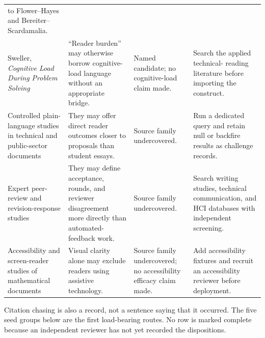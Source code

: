 \begin{longtable}{@{}>{\raggedright\arraybackslash}p{}
>{\raggedright\arraybackslash}p{}
>{\raggedright\arraybackslash}p{}
>{\raggedright\arraybackslash}p{}@{}}
to Flower--Hayes and Bereiter--Scardamalia. \\
Sweller, \emph{Cognitive Load During Problem Solving} & ``Reader burden'' may
otherwise borrow cognitive-load language without an appropriate bridge. &
Named candidate; no cognitive-load claim made. & Search the applied technical-
reading literature before importing the construct. \\
Controlled plain-language studies in technical and public-sector documents &
They may offer direct reader outcomes closer to proposals than student essays.
& Source family undercovered. & Run a dedicated query and retain null or
backfire results as challenge records. \\
Expert peer-review and revision-response studies & They may define acceptance,
rounds, and reviewer disagreement more directly than automated-feedback work. &
Source family undercovered. & Search writing studies, technical communication,
and HCI databases with independent screening. \\
Accessibility and screen-reader studies of mathematical documents & Visual
clarity alone may exclude readers using assistive technology. & Source family
undercovered; no accessibility efficacy claim made. & Add accessibility
fixtures and recruit an accessibility reviewer before deployment. \\
\bottomrule
\end{longtable}

Citation chasing is also a record, not a sentence saying that it occurred. The
five seed groups below are the first load-bearing routes. No row is marked
complete because an independent reviewer has not yet recorded the dispositions.

